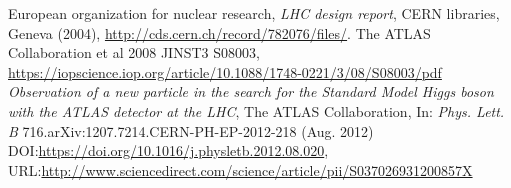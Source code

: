 \documentclass[a4paper, oneside, 11pt]{book}
\begin{document}
	
	\begin{thebibliography}{3}
		European organization for nuclear research, \textit{LHC design report}, CERN libraries, Geneva (2004), \url{http://cds.cern.ch/record/782076/files/}.
		The ATLAS Collaboration et al 2008 JINST3 S08003,
		\url{https://iopscience.iop.org/article/10.1088/1748-0221/3/08/S08003/pdf}
		\textit{Observation of a new particle in the search for the Standard Model Higgs boson with the ATLAS detector at the LHC},
		The ATLAS Collaboration, In: \textit{Phys. Lett. B} 716.arXiv:1207.7214.CERN-PH-EP-2012-218 (Aug. 2012) DOI:\url{https://doi.org/10.1016/j.physletb.2012.08.020}, URL:\url{http://www.sciencedirect.com/science/article/pii/S037026931200857X}
	\end{thebibliography}
	
\end{document}
